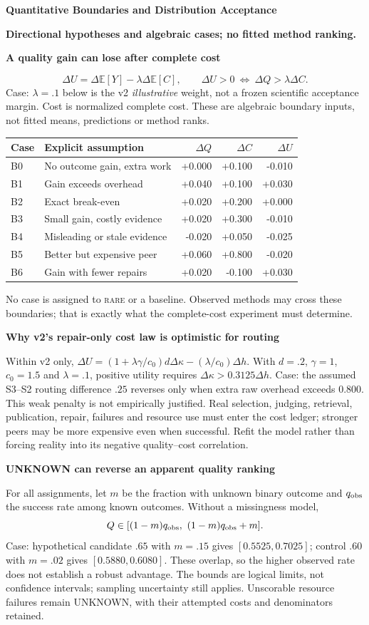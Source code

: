 \documentclass[10pt,a4paper]{article}
\newcommand{\lead}[1]{\vspace{4pt}\textbf{#1}\par}
\newcommand{\rare}{\textsc{rare}}
\newcommand{\caution}{\textcolor{red!70!black}{\textbf{Directional hypotheses and algebraic cases; no fitted method ranking.}}\par}
\begin{document}
\clearpage
{\large\bfseries Quantitative Boundaries and Distribution Acceptance}\par\caution
\lead{A quality gain can lose after complete cost}
\[
 \Delta U=\Delta\mathbb E[Y]-\lambda\Delta\mathbb E[C],\qquad
 \Delta U>0\ \Longleftrightarrow\ \Delta Q>\lambda\Delta C.
\]
Case: $\lambda=.1$ below is the v2 \emph{illustrative} weight, not a frozen
scientific acceptance margin. Cost is normalized complete cost. These are
algebraic boundary inputs, not fitted means, predictions or method ranks.
\begin{center}\small
\begin{tabularx}{\linewidth}{@{}lXrrr@{}}\toprule
Case & Explicit assumption & $\Delta Q$ & $\Delta C$ & $\Delta U$\\\midrule
B0 & No outcome gain, extra work & +0.000 & +0.100 & -0.010\\
B1 & Gain exceeds overhead & +0.040 & +0.100 & +0.030\\
B2 & Exact break-even & +0.020 & +0.200 & +0.000\\
B3 & Small gain, costly evidence & +0.020 & +0.300 & -0.010\\
B4 & Misleading or stale evidence & -0.020 & +0.050 & -0.025\\
B5 & Better but expensive peer & +0.060 & +0.800 & -0.020\\
B6 & Gain with fewer repairs & +0.020 & -0.100 & +0.030\\
\bottomrule\end{tabularx}\end{center}
No case is assigned to \rare{} or a baseline. Observed methods may cross these
boundaries; that is exactly what the complete-cost experiment must determine.

\lead{Why v2's repair-only cost law is optimistic for routing}
Within v2 only, $\Delta U=(1+\lambda\gamma/c_0)d\Delta\kappa
-(\lambda/c_0)\Delta h$. With $d=.2$, $\gamma=1$, $c_0=1.5$ and $\lambda=.1$,
positive utility requires $\Delta\kappa>0.3125\Delta h$.
Case: the assumed S3--S2 routing difference $.25$ reverses only when extra raw
overhead exceeds $0.800$. This weak penalty is not empirically justified.
Real selection, judging, retrieval, publication, repair, failures and resource
use must enter the cost ledger; stronger peers may be more expensive even when
successful. Refit the model rather than forcing reality into its negative
quality--cost correlation.

\lead{UNKNOWN can reverse an apparent quality ranking}
For all assignments, let $m$ be the fraction with unknown binary outcome and
$q_{\rm obs}$ the success rate among known outcomes. Without a missingness model,
\[
 Q\in[(1-m)q_{\rm obs},\ (1-m)q_{\rm obs}+m].
\]
Case: hypothetical candidate $.65$ with $m=.15$ gives
$[0.5525, 0.7025]$; control $.60$ with $m=.02$ gives
$[0.5880, 0.6080]$. These overlap, so the higher observed rate does not
establish a robust advantage. The bounds are logical limits, not confidence
intervals; sampling uncertainty still applies. Unscorable resource failures
remain UNKNOWN, with their attempted costs and denominators retained.
\end{document}
